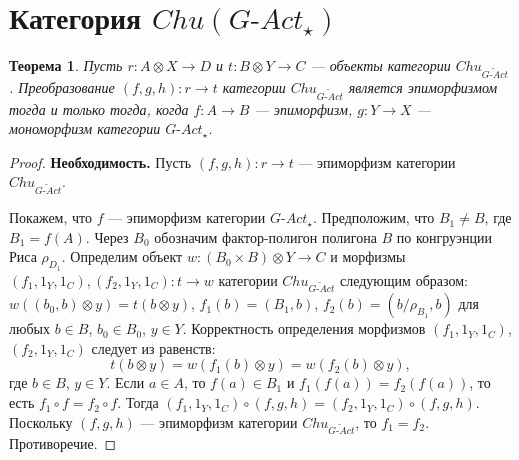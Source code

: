 \documentclass[a4paper,12pt]{article}
\newtheorem{theorem}{Теорема}
\newcommand{\GAct}{G\text{-}Act}
\begin{document}
\section*{Категория $Chu(\GAct_{\star})$}

\begin{theorem}\label{epimorphism-gact}
    Пусть $r: A \otimes X \to D$ и $t: B \otimes Y \to C$ --- объекты категории $Chu_{\widetilde{\GAct}}$. Преобразование $(f,g,h): r \to t$ категории $Chu_{\widetilde{\GAct}}$ является эпиморфизмом тогда и только тогда, когда $f: A \to B$ --- эпиморфизм, $g: Y \to X$ --- мономорфизм категории $\GAct_{\star}$.
\end{theorem}
\begin{proof}
    \textbf{Необходимость.} Пусть $(f,g,h): r \to t$ --- эпиморфизм категории $Chu_{\widetilde{\GAct}}$.

    Покажем, что $f$ --- эпиморфизм категории $\GAct_{\star}$. Предположим, что $B_1 \ne B$, где $B_1 = f(A)$. Через $B_0$ обозначим фактор-полигон полигона $B$ по конгруэнции Риса $\rho_{D_1}$. Определим объект $w: (B_0 \times B) \otimes Y \to C$ и морфизмы $(f_1,1_Y,1_C), (f_2,1_Y,1_C): t \to w$ категории $Chu_{\widetilde{\GAct}}$ следующим образом: $w((b_0,b) \otimes y) = t(b \otimes y)$, $f_1(b) = (B_1,b)$, $f_2(b) = (b/\rho_{B_1},b)$ для любых $b \in B$, $b_0 \in B_0$, $y \in Y$. Корректность определения морфизмов $(f_1,1_Y,1_C)$, $(f_2,1_Y,1_C)$ следует из равенств:
    $$
        t(b \otimes y) = w(f_1(b) \otimes y) = w(f_2(b) \otimes y),
    $$
    где $b \in B$, $y \in Y$. Если $a \in A$, то $f(a) \in B_1$ и $f_1(f(a)) = f_2(f(a))$, то есть $f_1 \circ f = f_2 \circ f$. Тогда $(f_1,1_Y,1_C) \circ (f,g,h) = (f_2,1_Y,1_C) \circ (f,g,h)$. Поскольку $(f,g,h)$ --- эпиморфизм категории $Chu_{\widetilde{\GAct}}$, то $f_1 = f_2$. Противоречие.


\end{proof}
\end{document}
